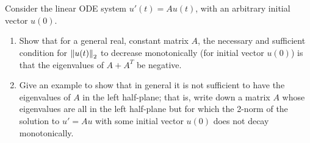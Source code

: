 \documentclass[10pt]{article}
\begin{document}
\begin{problem}
    Consider the linear ODE system \( u'(t) = Au(t) \), with an arbitrary initial vector \( u(0) \).
    \begin{enumerate}[label=(\alph*),nolistsep]
        \item Show that for a general real, constant matrix \( A \), the necessary and sufficient condition for \( \left\lVert u(t)\right\rVert_2 \) to decrease monotonically (for initial vector \( u(0) \)) is that the eigenvalues of \( A + A^T \) be negative.
        \item Give an example to show that in general it is not sufficient to have the eigenvalues of \( A \) in the left half-plane; that is, write down a matrix \( A \) whose eigenvalues are all in the left half-plane but for which the 2-norm of the solution to \( u' = Au \) with some initial vector \( u(0) \) does not decay monotonically.
    \end{enumerate}
\end{problem}
\end{document}
